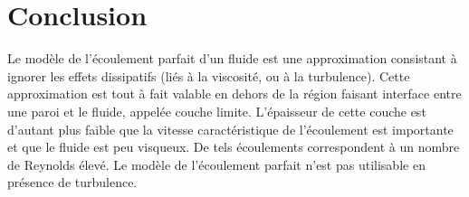 \documentclass[11pt,a4paper]{report}
\begin{document}
\newpage
\section{Conclusion}

Le modèle de l'écoulement parfait d'un fluide est une approximation consistant à ignorer les effets dissipatifs (liés à la viscosité, ou à la turbulence). Cette approximation est tout à fait valable en dehors de la région faisant interface entre une paroi et le fluide, appelée couche limite. L'épaisseur de cette couche est d'autant plus faible que la vitesse caractéristique de l'écoulement est importante et que le fluide est peu visqueux. De tels écoulements correspondent à un nombre de Reynolds élevé. Le modèle de l'écoulement parfait n'est pas utilisable en présence de turbulence.
\end{document}
